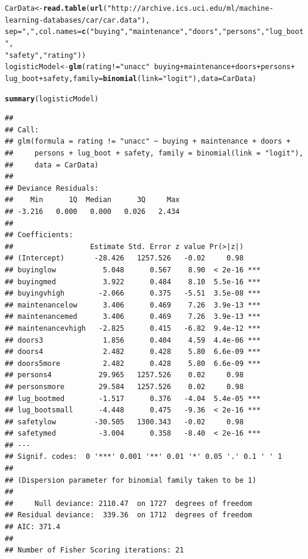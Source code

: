 \documentclass[12pt, a4paper, oneside]{article}\usepackage[]{graphicx}\usepackage[]{color}
\makeatletter
\newcommand{\hlstr}[1]{\textcolor[rgb]{0.192,0.494,0.8}{#1}}%
\newcommand{\hlopt}[1]{\textcolor[rgb]{0,0,0}{#1}}%
\newcommand{\hlstd}[1]{\textcolor[rgb]{0.345,0.345,0.345}{#1}}%
\newcommand{\hlkwb}[1]{\textcolor[rgb]{0.69,0.353,0.396}{#1}}%
\newcommand{\hlkwc}[1]{\textcolor[rgb]{0.333,0.667,0.333}{#1}}%
\newcommand{\hlkwd}[1]{\textcolor[rgb]{0.737,0.353,0.396}{\textbf{#1}}}%
\newenvironment{kframe}{%
 \def\at@end@of@kframe{}%
 \ifinner\ifhmode%
  \def\at@end@of@kframe{\end{minipage}}%
  \begin{minipage}{\columnwidth}%
 \fi\fi%
 \def\FrameCommand##1{\hskip\@totalleftmargin \hskip-\fboxsep
 \colorbox{shadecolor}{##1}\hskip-\fboxsep
     \hskip-\linewidth \hskip-\@totalleftmargin \hskip\columnwidth}%
 \MakeFramed {\advance\hsize-\width
   \@totalleftmargin\z@ \linewidth\hsize
   \@setminipage}}%
 {\par\unskip\endMakeFramed%
 \at@end@of@kframe}
\newenvironment{knitrout}{}{} %
\makeatother
\begin{document}
\begin{knitrout}
\color{fgcolor}\begin{kframe}
\begin{alltt}
\hlstd{CarData} \hlkwb{<-} \hlkwd{read.table}\hlstd{(}\hlkwd{url}\hlstd{(}\hlstr{"http://archive.ics.uci.edu/ml/machine-learning-databases/car/car.data"}\hlstd{),}
    \hlkwc{sep} \hlstd{=} \hlstr{","}\hlstd{,} \hlkwc{col.names} \hlstd{=} \hlkwd{c}\hlstd{(}\hlstr{"buying"}\hlstd{,} \hlstr{"maintenance"}\hlstd{,} \hlstr{"doors"}\hlstd{,} \hlstr{"persons"}\hlstd{,} \hlstr{"lug_boot"}\hlstd{,}
        \hlstr{"safety"}\hlstd{,} \hlstr{"rating"}\hlstd{))}
\hlstd{logisticModel} \hlkwb{<-} \hlkwd{glm}\hlstd{(rating} \hlopt{!=} \hlstr{"unacc"} \hlopt{~} \hlstd{buying} \hlopt{+} \hlstd{maintenance} \hlopt{+} \hlstd{doors} \hlopt{+} \hlstd{persons} \hlopt{+}
    \hlstd{lug_boot} \hlopt{+} \hlstd{safety,} \hlkwc{family} \hlstd{=} \hlkwd{binomial}\hlstd{(}\hlkwc{link} \hlstd{=} \hlstr{"logit"}\hlstd{),} \hlkwc{data} \hlstd{= CarData)}
\end{alltt}


{\ttfamily\noindent\color{warningcolor}{\#\# Warning: glm.fit: fitted probabilities numerically 0 or 1 occurred}}\begin{alltt}
\hlkwd{summary}\hlstd{(logisticModel)}
\end{alltt}
\begin{verbatim}
## 
## Call:
## glm(formula = rating != "unacc" ~ buying + maintenance + doors + 
##     persons + lug_boot + safety, family = binomial(link = "logit"), 
##     data = CarData)
## 
## Deviance Residuals: 
##    Min      1Q  Median      3Q     Max  
## -3.216   0.000   0.000   0.026   2.434  
## 
## Coefficients:
##                  Estimate Std. Error z value Pr(>|z|)    
## (Intercept)       -28.426   1257.526   -0.02     0.98    
## buyinglow           5.048      0.567    8.90  < 2e-16 ***
## buyingmed           3.922      0.484    8.10  5.5e-16 ***
## buyingvhigh        -2.066      0.375   -5.51  3.5e-08 ***
## maintenancelow      3.406      0.469    7.26  3.9e-13 ***
## maintenancemed      3.406      0.469    7.26  3.9e-13 ***
## maintenancevhigh   -2.825      0.415   -6.82  9.4e-12 ***
## doors3              1.856      0.404    4.59  4.4e-06 ***
## doors4              2.482      0.428    5.80  6.6e-09 ***
## doors5more          2.482      0.428    5.80  6.6e-09 ***
## persons4           29.965   1257.526    0.02     0.98    
## personsmore        29.584   1257.526    0.02     0.98    
## lug_bootmed        -1.517      0.376   -4.04  5.4e-05 ***
## lug_bootsmall      -4.448      0.475   -9.36  < 2e-16 ***
## safetylow         -30.505   1300.343   -0.02     0.98    
## safetymed          -3.004      0.358   -8.40  < 2e-16 ***
## ---
## Signif. codes:  0 '***' 0.001 '**' 0.01 '*' 0.05 '.' 0.1 ' ' 1
## 
## (Dispersion parameter for binomial family taken to be 1)
## 
##     Null deviance: 2110.47  on 1727  degrees of freedom
## Residual deviance:  339.36  on 1712  degrees of freedom
## AIC: 371.4
## 
## Number of Fisher Scoring iterations: 21
\end{verbatim}
\end{kframe}
\end{knitrout}
\end{document}
